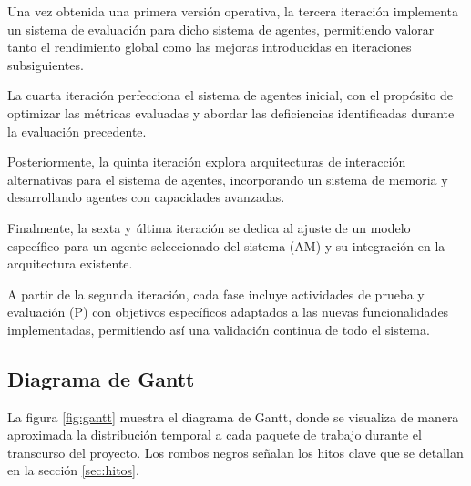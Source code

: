 Una vez obtenida una primera versión operativa, la tercera iteración implementa un sistema de evaluación para dicho sistema de agentes, permitiendo valorar tanto el rendimiento global como las mejoras introducidas en iteraciones subsiguientes.

La cuarta iteración perfecciona el sistema de agentes inicial, con el propósito de optimizar las métricas evaluadas y abordar las deficiencias identificadas durante la evaluación precedente.

Posteriormente, la quinta iteración explora arquitecturas de interacción alternativas para el sistema de agentes, incorporando un sistema de memoria y desarrollando agentes con capacidades avanzadas.

Finalmente, la sexta y última iteración se dedica al ajuste de un modelo específico para un agente seleccionado del sistema (AM) y su integración en la arquitectura existente.

A partir de la segunda iteración, cada fase incluye actividades de prueba y evaluación (P) con objetivos específicos adaptados a las nuevas funcionalidades implementadas, permitiendo así una validación continua de todo el sistema.


\subsection{Diagrama de Gantt}

La figura \ref{fig:gantt} muestra el diagrama de Gantt, donde se visualiza de manera aproximada la distribución temporal a cada paquete de trabajo durante el transcurso del proyecto. Los rombos negros señalan los hitos clave que se detallan en la sección \ref{sec:hitos}.


